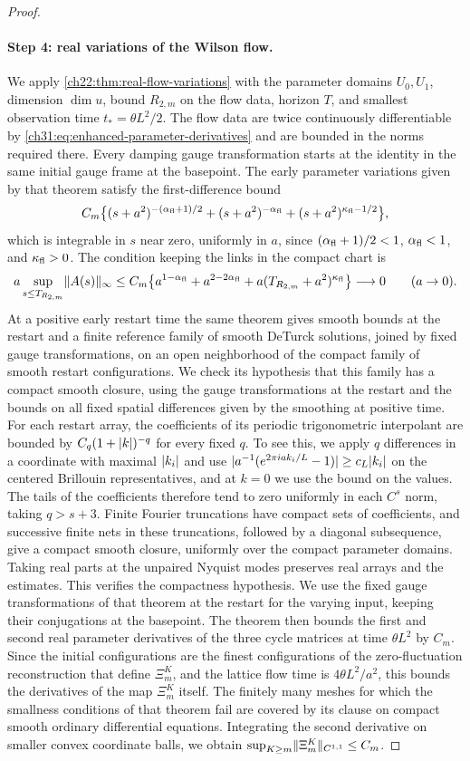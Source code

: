 \begin{proof}
\paragraph{Step 4: real variations of the Wilson flow.}
We apply \cref{ch22:thm:real-flow-variations} with the parameter domains $U_0,U_1$, dimension $\dim u$, bound $R_{2,m}$ on the flow data, horizon $T$, and smallest observation time $t_*=\theta L^2/2$. The flow data are twice continuously differentiable by \eqref{ch31:eq:enhanced-parameter-derivatives} and are bounded in the norms required there. Every damping gauge transformation starts at the identity in the same initial gauge frame at the basepoint. The early parameter variations given by that theorem satisfy the first-difference bound
\[
 C_m\bigl\{(s+a^2)^{-(\alpha_{\mathrm{fl}}+1)/2}+(s+a^2)^{-\alpha_{\mathrm{fl}}}+(s+a^2)^{\kappa_{\mathrm{fl}}-1/2}\bigr\},
\]
which is integrable in $s$ near zero, uniformly in $a$, since $(\alpha_{\mathrm{fl}}+1)/2<1$, $\alpha_{\mathrm{fl}}<1$, and $\kappa_{\mathrm{fl}}>0$. The condition keeping the links in the compact chart is
\[
 a\sup_{s\le T_{R_{2,m}}}\lVert A(s)\rVert_\infty\le C_m\bigl\{a^{1-\alpha_{\mathrm{fl}}}+a^{2-2\alpha_{\mathrm{fl}}}+a(T_{R_{2,m}}+a^2)^{\kappa_{\mathrm{fl}}}\bigr\}\longrightarrow0\qquad(a\to0).
\]
At a positive early restart time the same theorem gives smooth bounds at the restart and a finite reference family of smooth DeTurck solutions, joined by fixed gauge transformations, on an open neighborhood of the compact family of smooth restart configurations. We check its hypothesis that this family has a compact smooth closure, using the gauge transformations at the restart and the bounds on all fixed spatial differences given by the smoothing at positive time. For each restart array, the coefficients of its periodic trigonometric interpolant are bounded by $C_q(1+\lvert k\rvert)^{-q}$ for every fixed $q$. To see this, we apply $q$ differences in a coordinate with maximal $\lvert k_i\rvert$ and use $\lvert a^{-1}(e^{2\pi iak_i/L}-1)\rvert\ge c_L\lvert k_i\rvert$ on the centered Brillouin representatives, and at $k=0$ we use the bound on the values. The tails of the coefficients therefore tend to zero uniformly in each $C^s$ norm, taking $q>s+3$. Finite Fourier truncations have compact sets of coefficients, and successive finite nets in these truncations, followed by a diagonal subsequence, give a compact smooth closure, uniformly over the compact parameter domains. Taking real parts at the unpaired Nyquist modes preserves real arrays and the estimates. This verifies the compactness hypothesis. We use the fixed gauge transformations of that theorem at the restart for the varying input, keeping their conjugations at the basepoint. The theorem then bounds the first and second real parameter derivatives of the three cycle matrices at time $\theta L^2$ by $C_m$. Since the initial configurations are the finest configurations of the zero-fluctuation reconstruction that define $\Xi_m^K$, and the lattice flow time is $4\theta L^2/a^2$, this bounds the derivatives of the map $\Xi_m^K$ itself. The finitely many meshes for which the smallness conditions of that theorem fail are covered by its clause on compact smooth ordinary differential equations. Integrating the second derivative on smaller convex coordinate balls, we obtain $\sup_{K\ge m}\lVert \Xi_m^K\rVert_{C^{1,1}}\le C_m$.


\end{proof}
